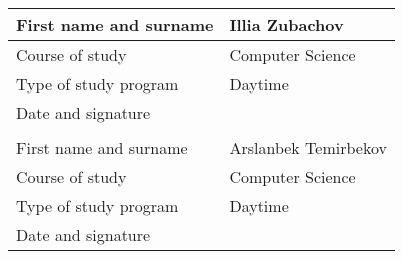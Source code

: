 \begin{description}
\begin{tabular}{|p{}|p{}|}
        \hline
        First name and surname & Illia Zubachov       \\
        \hline
        Course of study        & Computer Science     \\
        \hline
        Type of study program  & Daytime              \\
        \hline
        Date and signature     &                      \\
        \hline

        \multicolumn{2}{c}{\vspace{0.5cm}} \\

        \hline
        First name and surname & Arslanbek Temirbekov \\
        \hline
        Course of study        & Computer Science     \\
        \hline
        Type of study program  & Daytime              \\
        \hline
        Date and signature     &                      \\
        \hline
    \end{tabular}
\end{description}